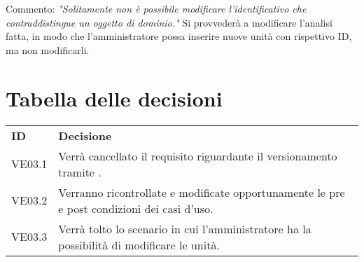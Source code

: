 \documentclass[]{article}
\begin{document}
		\noindent Commento: \textit{"Solitamente non è possibile modificare l’identificativo che contraddistingue un oggetto di dominio."}
		\newline
		Si provvederà a modificare l'analisi fatta, in modo che l'amministratore possa inserire nuove unità con rispettivo ID, ma non modificarli.

	\newpage

	\section{Tabella delle decisioni}

\begin{table} [h!]
	\begin{center}
		\begin{tabular} { m{2cm} m{14cm} }
			\rowcolor{lightgray}
			\textbf{ID} & \textbf{Decisione}\\
			VE03.1 & Verrà cancellato il requisito riguardante il versionamento tramite \glock{Github}.\\
			VE03.2 & Verranno ricontrollate e modificate opportunamente le pre e post condizioni dei casi d'uso.\\
			VE03.3 & Verrà tolto lo scenario in cui l'amministratore ha la possibilità di modificare le unità.
		\end{tabular}
	\end{center}
\end{table}
\end{document}
